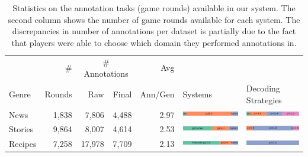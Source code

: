 \begin{table}[tb]
\center
\small
\caption{Statistics on the annotation tasks (game rounds) available in our system. The second column shows the number of game rounds available for each system. The discrepancies in number of annotations per dataset is partially due to the fact that players were able to choose which domain they performed annotations in.}
\label{tab:dataset_stats}
	\begin{tabular}{l|r|rr|r|p{2in}|p{1.5in}}
\toprule
 & \# & \multicolumn{2}{|c|}{\# Annotations} & {Avg} & & \\
Genre & Rounds & Raw & Final & Ann/Gen & Systems & Decoding Strategies \\
\midrule
News & 1,838 & 7,806 & 4,488 & 2.97 &
\begin{minipage}{.275\textwidth}
      \includegraphics[height=1em]{figures/model_dist_new_york_times}
\end{minipage}
&
\begin{minipage}{.225\textwidth}
      \includegraphics[height=1em]{figures/decoding_dist_new_york_times}
\end{minipage}
\\
Stories & 9,864 & 8,007 & 4,614 & 2.53 &
\begin{minipage}{.275\textwidth}
      \includegraphics[height=1em]{figures/model_dist_short_stories}
\end{minipage}
&
\begin{minipage}{.225\textwidth}
      \includegraphics[height=1em]{figures/decoding_dist_short_stories}
\end{minipage}
\\
Recipes & 7,258 & 17,978 & 7,709 & 2.13 &
\begin{minipage}{.275\textwidth}
      \includegraphics[height=1em]{figures/model_dist_recipes}
\end{minipage}
&
\begin{minipage}{.225\textwidth}
      \includegraphics[height=1em]{figures/decoding_dist_recipes}

\end{minipage}
\end{tabular}
\end{table}
